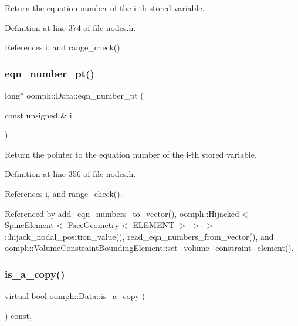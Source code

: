 Return the equation number of the i-\/th stored variable. 



Definition at line 374 of file nodes.\+h.



References i, and range\+\_\+check().

\mbox{\label{classoomph_1_1Data_a35cc8d05b72d9101e54ddf5808da4a54}} 
\subsubsection{\texorpdfstring{eqn\+\_\+number\+\_\+pt()}{eqn\_number\_pt()}}
{\footnotesize\ttfamily long$\ast$ oomph\+::\+Data\+::eqn\+\_\+number\+\_\+pt (\begin{DoxyParamCaption}\item[{const unsigned \&}]{i }\end{DoxyParamCaption})\hspace{0.3cm}{\ttfamily [inline]}}



Return the pointer to the equation number of the i-\/th stored variable. 



Definition at line 356 of file nodes.\+h.



References i, and range\+\_\+check().



Referenced by add\+\_\+eqn\+\_\+numbers\+\_\+to\+\_\+vector(), oomph\+::\+Hijacked$<$ Spine\+Element$<$ Face\+Geometry$<$ E\+L\+E\+M\+E\+N\+T $>$ $>$ $>$\+::hijack\+\_\+nodal\+\_\+position\+\_\+value(), read\+\_\+eqn\+\_\+numbers\+\_\+from\+\_\+vector(), and oomph\+::\+Volume\+Constraint\+Bounding\+Element\+::set\+\_\+volume\+\_\+constraint\+\_\+element().

\mbox{\label{classoomph_1_1Data_a736feee0f95ab3d542c70db6ca7ab233}} 
\subsubsection{\texorpdfstring{is\+\_\+a\+\_\+copy()}{is\_a\_copy()}\hspace{0.1cm}{\footnotesize\ttfamily [1/2]}}
{\footnotesize\ttfamily virtual bool oomph\+::\+Data\+::is\+\_\+a\+\_\+copy (\begin{DoxyParamCaption}{ }\end{DoxyParamCaption}) const\hspace{0.3cm}{\ttfamily [inline]}, {\ttfamily [virtual]}}



